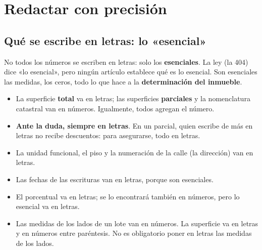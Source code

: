 \documentclass[12pt,oneside]{book}
\begin{document}
\chapter[Redactar con precisión]{Redactar con precisión}

\section{Qué se escribe en letras: lo «esencial»}

No todos los números se escriben en letras: solo los \textbf{esenciales}. La ley (la 404) dice «lo esencial», pero ningún artículo establece qué es lo esencial. Son esenciales las medidas, los ceros, todo lo que hace a la \textbf{determinación del inmueble}.

\begin{itemize}
    \item La superficie \textbf{total} va en letras; las superficies \textbf{parciales} y la nomenclatura catastral van en números. Igualmente, todos agregan el número.
    \item \textbf{Ante la duda, siempre en letras}. En un parcial, quien escribe de más en letras no recibe descuentos: para asegurarse, todo en letras.
    \item La unidad funcional, el piso y la numeración de la calle (la dirección) van en letras.
    \item Las fechas de las escrituras van en letras, porque son esenciales.
    \item El porcentual va en letras; se lo encontrará también en números, pero lo esencial va en letras.
    \item Las medidas de los lados de un lote van en números. La superficie va en letras y en números entre paréntesis. No es obligatorio poner en letras las medidas de los lados.
\end{itemize}
\end{document}
